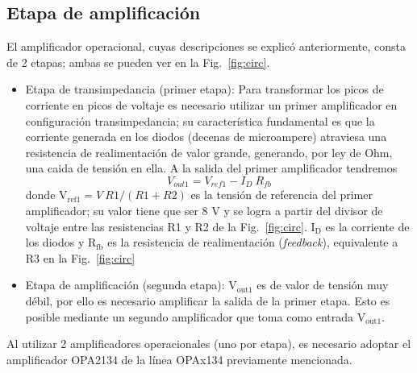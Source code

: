 \documentclass[a4paper,conference]{IEEEtran}
\begin{document}
        \subsection{Etapa de amplificación}
            El amplificador operacional, cuyas descripciones se explicó
            anteriormente, consta de 2 etapas; ambas se pueden ver en la
            Fig.~\ref{fig:circ}.
            \begin{itemize}
                \item Etapa de transimpedancia (primer etapa): Para transformar
                    los picos de corriente en picos de voltaje es necesario
                    utilizar un primer amplificador en configuración
                    transimpedancia; su característica fundamental es que la
                    corriente generada en los diodos (decenas de microampere)
                    atraviesa una resistencia de realimentación de valor grande,
                    generando, por ley de Ohm, una caida de tensión en ella. A
                    la salida del primer amplificador tendremos
                    \begin{equation*}
                        V_{out1} = V_{ref1} - I_{D}\ R_{fb}
                    \end{equation*}
                    donde $\mathrm{V_{ref1}} = V\ R1/(R1+R2)$ es la tensión de referencia del
                    primer amplificador; su valor tiene que ser 8 V y se logra a
                    partir del divisor de voltaje entre las resistencias R1 y R2
                    de la Fig.~\ref{fig:circ}. $\mathrm{I_{D}}$ es la corriente
                    de los diodos y $\mathrm{R_{fb}}$ es la resistencia de
                    realimentación (\emph{feedback}), equivalente a R3 en
                    la Fig.~\ref{fig:circ}
                \item Etapa de amplificación (segunda etapa):
                    $\mathrm{V_{out1}}$ es de valor de tensión muy débil, por
                    ello es necesario amplificar la salida de la primer etapa.
                    Esto es posible mediante un segundo amplificador que toma
                    como entrada $\mathrm{V_{out1}}$.
            \end{itemize}

            Al utilizar 2 amplificadores operacionales (uno por etapa), es
            necesario adoptar el amplificador OPA2134 de la línea OPAx134
            previamente mencionada. 
\end{document}

